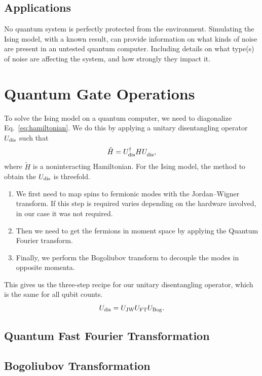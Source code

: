 \documentclass[12pt]{article}
\begin{document}
  \subsection{Applications}

No quantum system is perfectly protected from the environment. Simulating the Ising model, with a known result, can provide information on what kinds of noise are present in an untested quantum computer. Including details on what type(s) of noise are affecting the system, and how strongly they impact it.

  \section{Quantum Gate Operations}
 To solve the Ising model on a quantum computer, we need to diagonalize Eq.~\eqref{eq:hamiltonian}. We do this by applying a unitary disentangling operator \( U_{\textnormal{dis}} \) such that
  \begin{equation}
    \tilde{H}
      = U_{\textnormal{dis}}^{\dagger} H
        U_{\textnormal{dis}}^{\vphantom{\dagger}},
  \end{equation}
  where \( \tilde{H} \) is a noninteracting Hamiltonian. For the Ising model, the method to obtain the \( U_{\textnormal{dis}} \) is threefold.
  \begin{enumerate}
   \item We first need to map spins to fermionic modes with the Jordan--Wigner transform. If this step is required varies depending on the hardware involved, in our case it was not required.
   \item Then we need to get the fermions in moment space by applying the Quantum Fourier transform.
   \item Finally, we perform the Bogoliubov transform to decouple the modes in opposite momenta.
  \end{enumerate}
  This gives us the three-step recipe for our unitary disentangling operator, which is the same for all qubit counts.
  \begin{equation}
    U_{\textnormal{dis}}
      = U_{\textnormal{JW}} U_{\textnormal{FT}} U_{\textnormal{Bog}}.
  \end{equation}

  \subsection{Quantum Fast Fourier Transformation}

  \subsection{Bogoliubov Transformation}
\end{document}
